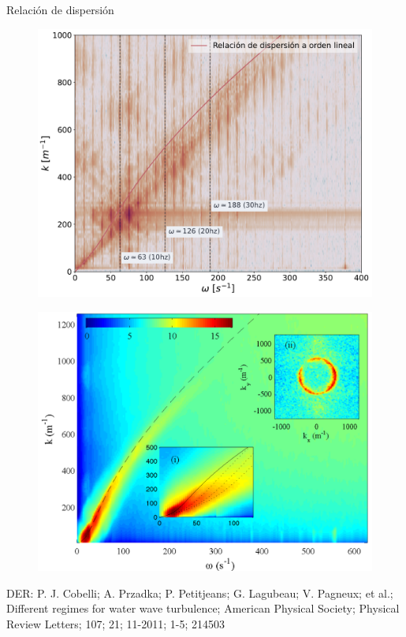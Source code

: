 \documentclass[aspectratio=169]{beamer}
\begin{document}
\begin{frame}{Relación de dispersión} %
	\begin{minipage}{0.46\textwidth}
	  \begin{figure}
		  \centering
	    \includegraphics[width=\linewidth]{figs/dispersion_relation_mod_fase.pdf}
	  \end{figure}
	\end{minipage} \hfill
	\begin{minipage}{0.46\textwidth}
	  \begin{figure}
	    \includegraphics[width=\linewidth]{figs/dispersion_relation_cobelli.png}
	  \end{figure}
	\end{minipage}

	\vfill
	\tiny DER: P. J. Cobelli; A. Przadka; P. Petitjeans; G. Lagubeau; V. Pagneux; et al.; Different regimes for water wave turbulence; American Physical Society; Physical Review Letters; 107; 21; 11-2011; 1-5; 214503
\end{frame}
\end{document}
